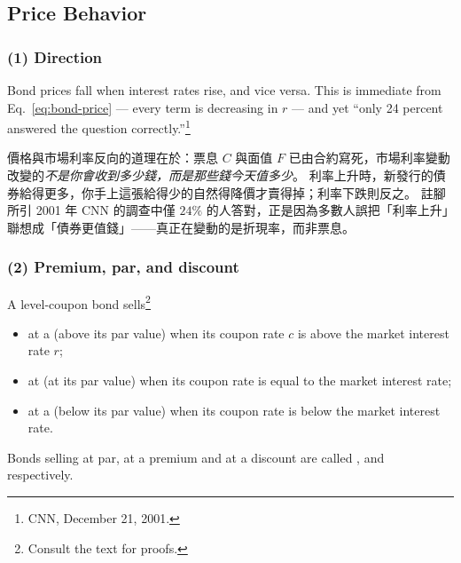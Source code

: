 \subsection{Price Behavior}


\subsubsection*{(1) Direction}

Bond prices fall when interest rates rise, and vice versa.
This is immediate from Eq.~\eqref{eq:bond-price} --- every term is decreasing in $r$ --- and yet ``only 24 percent answered the question correctly.''\footnote{CNN, December 21, 2001.}

\suppstart
\begin{remark}
	價格與市場利率反向的道理在於：票息 $C$ 與面值 $F$ 已由合約寫死，市場利率變動改變的\emph{不是你會收到多少錢，而是那些錢今天值多少}。
	利率上升時，新發行的債券給得更多，你手上這張給得少的自然得降價才賣得掉；利率下跌則反之。
	註腳所引 2001 年 CNN 的調查中僅 $24\%$ 的人答對，正是因為多數人誤把「利率上升」聯想成「債券更值錢」——真正在變動的是折現率，而非票息。
\end{remark}
\suppend

\subsubsection*{(2) Premium, par, and discount}

A level-coupon bond sells\footnote{Consult the text for proofs.}

\begin{itemize}[nosep]
	\item at a  (above its par value) when its coupon rate $c$ is above the market interest rate $r$;
	\item at  (at its par value) when its coupon rate is equal to the market interest rate;
	\item at a  (below its par value) when its coupon rate is below the market interest rate.
\end{itemize}

Bonds selling at par, at a premium and at a discount are called ,  and  respectively.

